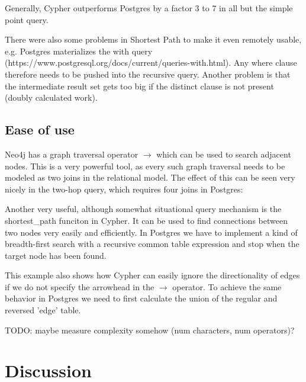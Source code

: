 \documentclass[11pt, a4paper,oneside,chapterprefix=false]{scrbook}
\begin{document}
Generally, Cypher outperforms Postgres by a factor 3 to 7 in all but the simple point query.

There were also some problems in Shortest Path to make it even remotely usable, e.g. Postgres materializes the with query (https://www.postgresql.org/docs/current/queries-with.html). Any where clause therefore needs to be pushed into the recursive query.
Another problem is that the intermediate result set gets too big if the distinct clause is not present (doubly calculated work).

\section{Ease of use} \label{sec:convenience}

Neo4j has a graph traversal operator $\rightarrow$ which can be used to search adjacent nodes.
This is a very powerful tool, as every such graph traversal needs to be modeled as two joins in the relational model.
The effect of this can be seen very nicely in the two-hop query, which requires four joins in Postgres:



Another very useful, although somewhat situational query mechanism is the shortest\_path funciton in Cypher.
It can be used to find connections between two nodes very easily and efficiently.
In Postgres we have to implement a kind of breadth-first search with a recursive common table expression and stop when the target node has been found.



This example also shows how Cypher can easily ignore the directionality of edges
if we do not specify the arrowhead in the $\rightarrow$ operator.
To achieve the same behavior in Postgres we need to first calculate the union of the regular and reversed 'edge' table.

TODO: maybe measure complexity somehow (num characters, num operators)?

\chapter{Discussion} \label{chp:discussion}
\end{document}
